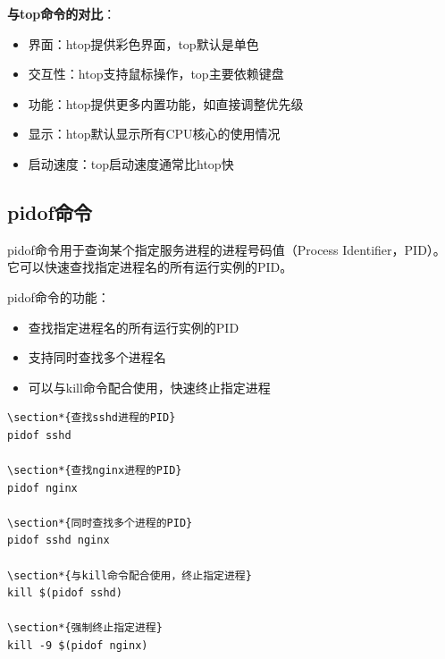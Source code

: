\documentclass[12pt,UTF8]{ctexbook}
\begin{document}
\textbf{与top命令的对比}：
\begin{itemize}
    \item 界面：htop提供彩色界面，top默认是单色
    \item 交互性：htop支持鼠标操作，top主要依赖键盘
    \item 功能：htop提供更多内置功能，如直接调整优先级
    \item 显示：htop默认显示所有CPU核心的使用情况
    \item 启动速度：top启动速度通常比htop快
\end{itemize}

\subsection{pidof命令}
pidof命令用于查询某个指定服务进程的进程号码值（Process Identifier，PID）。它可以快速查找指定进程名的所有运行实例的PID。

pidof命令的功能：
\begin{itemize}
    \item 查找指定进程名的所有运行实例的PID
    \item 支持同时查找多个进程名
    \item 可以与kill命令配合使用，快速终止指定进程
\end{itemize}

\begin{verbatim}
\section*{查找sshd进程的PID}
pidof sshd

\section*{查找nginx进程的PID}
pidof nginx

\section*{同时查找多个进程的PID}
pidof sshd nginx

\section*{与kill命令配合使用，终止指定进程}
kill $(pidof sshd)

\section*{强制终止指定进程}
kill -9 $(pidof nginx)
\end{verbatim}
\end{document}
